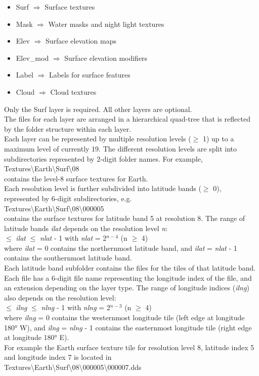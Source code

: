 \documentclass[Orbiter Developer Manual.tex]{subfiles}
\begin{document}
\begin{itemize}
\item Surf $\Rightarrow$ Surface textures
\item Mask $\Rightarrow$ Water masks and night light textures
\item Elev $\Rightarrow$ Surface elevation maps
\item Elev\_mod $\Rightarrow$ Surface elevation modifiers
\item Label $\Rightarrow$ Labels for surface features
\item Cloud $\Rightarrow$ Cloud textures
\end{itemize}

\noindent
Only the Surf layer is required. All other layers are optional.\\
The files for each layer are arranged in a hierarchical quad-tree that is reflected by the folder structure within each layer.\\
Each layer can be represented by multiple resolution levels ($\geq$ 1) up to a maximum level of currently 19. The different resolution levels are split into subdirectories represented by 2-digit folder names. For example,\\
\indent Textures\textbackslash Earth\textbackslash Surf\textbackslash 08\\
contains the level-8 surface textures for Earth.\\
Each resolution level is further subdivided into latitude bands ($\geq$ 0), represented by 6-digit subdirectories, e.g.\\
\indent Textures\textbackslash Earth\textbackslash Surf\textbackslash 08\textbackslash 000005\\
contains the surface textures for latitude band 5 at resolution 8. The range of latitude bands \textit{ilat} depends on the resolution level \textit{n}:\\
 $\leq$ \textit{ilat} $\leq$ \textit{nlat} - 1  with  \textit{nlat} = 2$^{n-4}$  (n $\geq$ 4)\\
where \textit{ilat} = 0 contains the northernmost latitude band, and \textit{ilat} = \textit{nlat} - 1 contains the southernmost latitude band.\\
Each latitude band subfolder contains the files for the tiles of that latitude band. Each file has a 6-digit file name representing the longitude index of the file, and an extension depending on the layer type. The range of longitude indices (\textit{ilng}) also depends on the resolution level:\\
 $\leq$ \textit{ilng} $\leq$ \textit{nlng} - 1  with  \textit{nlng} = 2$^{n-3}$  (n $\geq$ 4)\\
where \textit{ilng} = 0 contains the westernmost longitude tile (left edge at longitude 180° W), and \textit{ilng} = \textit{nlng} - 1 contains the easternmost longitude tile (right edge at longitude 180° E).\\
For example the Earth surface texture tile for resolution level 8, latitude index 5 and longitude index 7 is located in\\
\indent Textures\textbackslash Earth\textbackslash Surf\textbackslash 08\textbackslash 000005\textbackslash 000007.dds
\end{document}

